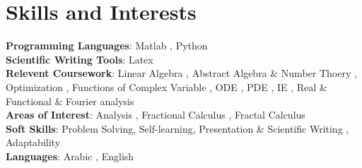 \documentclass[a4paper,11pt]{article}
\makeatletter
\newcommand{\resumePOR}[3]{
\vspace{0.5mm}\item
    \begin{tabular*}{0.97\textwidth}[t]{l@{\extracolsep{\fill}}r}
        \textbf{#1}\hspace{0.3mm}#2 & \textit{\small{#3}} 
    \end{tabular*}
    \vspace{-2mm}
}
\newcommand{\resumeSubHeadingListStart}{\begin{itemize}[leftmargin=*,labelsep=0mm]}
\newcommand{\resumeItemListStart}{\begin{justify}\begin{itemize}[leftmargin=3ex, rightmargin=2ex, noitemsep,labelsep=1.2mm,itemsep=0mm]\small}
\newcommand{\resumeSubHeadingListEnd}{\end{itemize}\vspace{2mm}}
\newcommand{\resumeItemListEnd}{\end{itemize}\end{justify}\vspace{-2mm}}
\makeatother
\begin{document}
\section{\textbf{Skills and Interests}}
 \begin{itemize}[leftmargin=0.05in, label={}]
    \small{\item{
     \textbf{Programming Languages}{: Matlab , Python} \\
     \textbf{Scientific Writing Tools}{: Latex} \\
     \textbf{Relevent Coursework}{: Linear Algebra , Abstract Algebra \& Number Thoery , Optimization , Functions of Complex Variable 
     , ODE , PDE , IE , Real \& Functional \& Fourier analysis} \\ 
     \textbf{Areas of Interest}{: Analysis , Fractional Calculus , Fractal Calculus}\\
     \textbf{Soft Skills}{: Problem Solving, Self-learning, Presentation \& Scientific Writing , Adaptability} \\
     \textbf{Languages}{: Arabic , English} \\
    }}
 \end{itemize}
 \vspace{-16pt}








    



\end{document}
